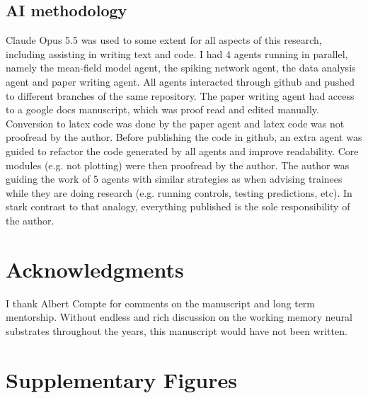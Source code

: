 \documentclass[11pt]{article}
\begin{document}
\subsection{AI methodology}

Claude Opus 5.5 was used to some extent for all aspects of this research, including assisting in writing text and code. I had 4 agents running in parallel, namely the mean-field model agent, the spiking network agent, the data analysis agent and paper writing agent. All agents interacted through github and pushed to different branches of the same repository. The paper writing agent had access to a google docs manuscript, which was proof read and edited manually. Conversion to latex code was done by the paper agent and latex code was not proofread by the author. Before publishing the code in github, an extra agent was guided to refactor the code generated by all agents and improve readability. Core modules (e.g. not plotting) were then proofread by the author. The author was guiding the work of 5 agents with similar strategies as when advising trainees while they are doing research (e.g. running controls, testing predictions, etc). In stark contrast to that analogy, everything published is the sole responsibility of the author.

\section*{Acknowledgments}

I thank Albert Compte for comments on the manuscript and long term mentorship. Without endless and rich discussion on the working memory neural substrates throughout the years, this manuscript would have not been written.




\clearpage
\section{Supplementary Figures}
\renewcommand{\figurename}{Supplementary Figure}
\setcounter{figure}{0}
\end{document}
